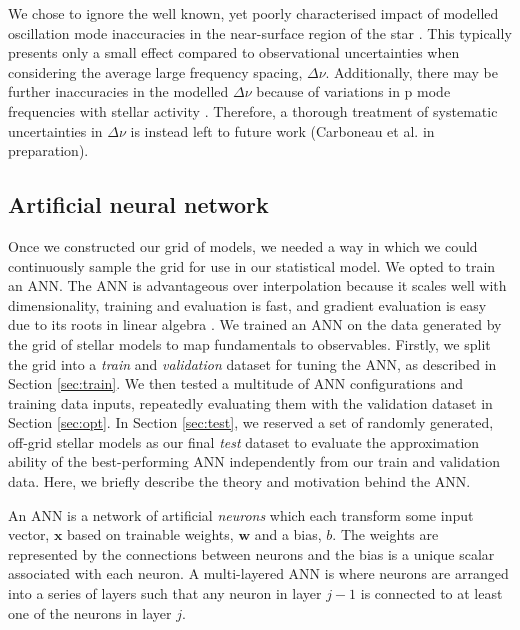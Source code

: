 \documentclass[a4paper,fleqn,usenatbib]{mnras}
\newcommand{\dnu}{\ensuremath{\Delta\nu}}
\begin{document}
We chose to ignore the well known, yet poorly characterised impact of modelled oscillation mode inaccuracies in the near-surface region of the star \citep{Kjeldsen.Bedding.ea2008, Ball.Gizon2014, Sonoi.Samadi.ea2015}. This typically presents only a small effect compared to observational uncertainties when considering the average large frequency spacing, $\dnu$. Additionally, there may be further inaccuracies in the modelled $\dnu$ because of variations in p mode frequencies with stellar activity \citep{Chaplin.Elsworth.ea2007, Kiefer.Schad.ea2017}. Therefore, a thorough treatment of systematic uncertainties in $\dnu$ is instead left to future work (Carboneau et al. in preparation). %

\subsection{Artificial neural network}\label{sec:ann}

Once we constructed our grid of models, we needed a way in which we could continuously sample the grid for use in our statistical model. We opted to train an ANN. The ANN is advantageous over interpolation because it scales well with dimensionality, training and evaluation is fast, and gradient evaluation is easy due to its roots in linear algebra \citep{Haykin2007}. We trained an ANN on the data generated by the grid of stellar models to map fundamentals to observables. Firstly, we split the grid into a \emph{train} and \emph{validation} dataset for tuning the ANN, as described in Section \ref{sec:train}. We then tested a multitude of ANN configurations and training data inputs, repeatedly evaluating them with the validation dataset in Section \ref{sec:opt}. In Section \ref{sec:test}, we reserved a set of randomly generated, off-grid stellar models as our final \emph{test} dataset to evaluate the approximation ability of the best-performing ANN independently from our train and validation data. Here, we briefly describe the theory and motivation behind the ANN.

An ANN is a network of artificial \emph{neurons} which each transform some input vector, $\boldsymbol{x}$ based on trainable weights, $\boldsymbol{w}$ and a bias, $b$. The weights are represented by the connections between neurons and the bias is a unique scalar associated with each neuron. A multi-layered ANN is where neurons are arranged into a series of layers such that any neuron in layer $j-1$ is connected to at least one of the neurons in layer $j$. 
\end{document}
